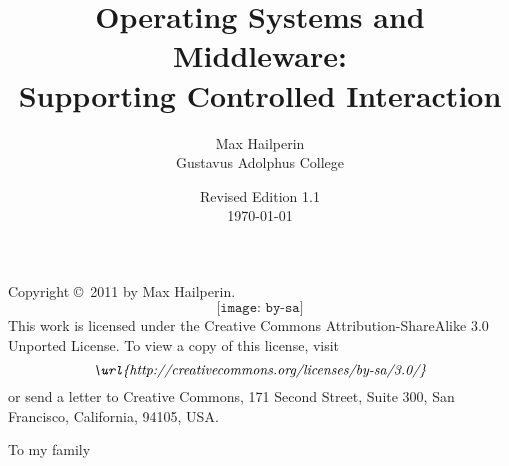 \documentclass[11pt]{book}
\title{Operating Systems and Middleware:\\Supporting Controlled Interaction}
\author{Max Hailperin\\Gustavus Adolphus College}
\date{Revised Edition 1.1\\\today}
\begin{document}

\frontmatter
\maketitle

\clearpage\thispagestyle{empty}
\noindent Copyright \copyright\ 2011 by Max Hailperin.
\[\texttt{[image: by-sa]}\]
This work is licensed under the Creative Commons Attribution-ShareAlike 3.0 Unported License. To view a copy of this
license, visit
\[ \textit{\url{http://creativecommons.org/licenses/by-sa/3.0/}} \]
or send a letter to Creative Commons, 171 Second Street,
Suite 300, San Francisco, California, 94105, USA.

\cleardoublepage\thispagestyle{empty}
\vspace*{10em}\centerline{To my family}

\tableofcontents

\makeatletter
\let\@oldmakeschapterhead\@makeschapterhead
\def\@makeschapterhead#1{\addcontentsline{toc}{chapter}{#1}%
  \@oldmakeschapterhead{#1}}
\renewcommand\thechapterenumi{\thechapter.\@arabic\c@chapterenumi}
\newcommand\labelchapterenumi{\thechapterenumi}
\def\chapterEnumerate{%
  \ifnum \@enumdepth >0\@toodeep\else
    \advance\@enumdepth\@ne
    \edef\@enumctr{chapterenum\romannumeral\the\@enumdepth}%
      \expandafter
      \list
        \csname label\@enumctr\endcsname
        {\usecounter\@enumctr\def\makelabel##1{\hss\llap{##1}}}%
  \fi}
\let\endchapterEnumerate =\endlist
\makeatother



\mainmatter













\appendix


\backmatter

\cleardoublepage
\printindex
\end{document}
